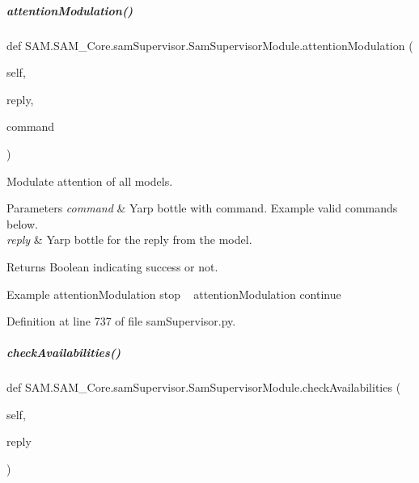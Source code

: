 \mbox{\label{group__icubclient__SAM__Core_ac1aec51c6d16e7a54ae777aac6ca4293}} 
\subparagraph{\texorpdfstring{attention\+Modulation()}{attentionModulation()}}
{\footnotesize\ttfamily def S\+A\+M.\+S\+A\+M\+\_\+\+Core.\+sam\+Supervisor.\+Sam\+Supervisor\+Module.\+attention\+Modulation (\begin{DoxyParamCaption}\item[{}]{self,  }\item[{}]{reply,  }\item[{}]{command }\end{DoxyParamCaption})}



Modulate attention of all models. 


\begin{DoxyParams}{Parameters}
{\em command} & Yarp bottle with command. Example valid commands below. \\
\hline
{\em reply} & Yarp bottle for the reply from the model.\\
\hline
\end{DoxyParams}
\begin{DoxyParagraph}{Returns}
Boolean indicating success or not.
\end{DoxyParagraph}
\begin{DoxyParagraph}{Example}
attention\+Modulation stop ~\newline
 attention\+Modulation continue 
\end{DoxyParagraph}


Definition at line 737 of file sam\+Supervisor.\+py.

\mbox{\label{group__icubclient__SAM__Core_aba9c86c4df4a79b54de5194c24f713e3}} 
\subparagraph{\texorpdfstring{check\+Availabilities()}{checkAvailabilities()}}
{\footnotesize\ttfamily def S\+A\+M.\+S\+A\+M\+\_\+\+Core.\+sam\+Supervisor.\+Sam\+Supervisor\+Module.\+check\+Availabilities (\begin{DoxyParamCaption}\item[{}]{self,  }\item[{}]{reply }\end{DoxyParamCaption})}



